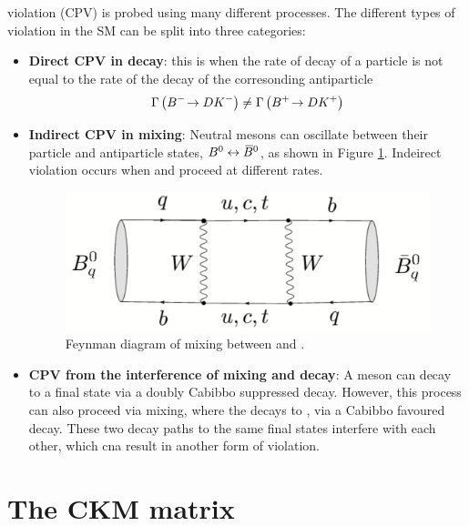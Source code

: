 \CP violation (CPV) is probed using many different processes. The different types of \CP violation in the SM can be split into three categories:
\begin{itemize}
\item \textbf{Direct CPV in decay}: this is when the rate of decay of a particle is not equal to the rate of the decay of the corresonding antiparticle \eg
\begin{equation*}
\Gamma\left({{{B}^-}}\!\rightarrow {\ensuremath{D}}{\ensuremath{{K}^-}}\right) \neq \Gamma\left({{{B}^+}}\!\rightarrow {\ensuremath{D}}{\ensuremath{{K}^+}}\right)
\end{equation*}
\item \textbf{Indirect CPV in mixing}: Neutral mesons can oscillate between their particle and antiparticle states, ${{B}^0} \leftrightarrow {\ensuremath{{\kern 0.18em\overline{\kern -0.18em B}{}}{}^0}}$, as shown in Figure \ref{mixing}. Indeirect \CP violation occurs when \decay{\Bz}{\Bzb} and \decay{\Bzb}{\Bz} proceed at different rates. 
\begin{figure}[h]
\centering
\includegraphics[width=0.5\linewidth]{figures/theory/mixing.pdf}
\caption{Feynman diagram of mixing between \Bz and \Bzb.}
\label{mixing}
\end{figure}
\item \textbf{CPV from the interference of mixing and decay}: A \Dz meson can decay to a \Kp\pim final state via a doubly Cabibbo suppressed decay. However, this process can also proceed via \decay{\Dz}{\Dzb} mixing, where the \Dzb decays to \Kp\pim, via a Cabibbo favoured decay. These two decay paths to the same final states interfere with each other, which cna result in another form of \CP violation.
\end{itemize} 

\section{The CKM matrix}

